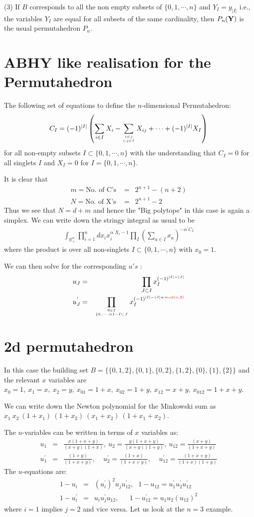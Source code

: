 \documentclass[hidelinks,12pt]{article}
\newcommand{\bea}[1]{\begin{eqnarray}\label{#1} }
\newcommand{\eea}{\end{eqnarray}}
\def\bea{\begin{eqnarray}}
\def\eea{\end{eqnarray}}
\begin{document}
\begin{enumerate}
(3) If $B$ corresponds to all the non empty subsets of $\{0,1,\cdots,n \}$ and $Y_I =y_{|I|}$ i.e., the variables $Y_I$ are equal for all subsets of the same cardinality, then $P_n({\bf Y})$ is the usual permutahedron $P_n$. 

\section*{ABHY like realisation for the Permutahedron}
The following set of equations to define the $n$-dimensional Permutahedron: 
\bea
C_I = (-1)^{|I|} \left( \sum_{i \in I} X_i - \sum _{{i<j}\atop{i,j \in I}} X_{ij} +\cdots + (-1)^{|I|}  X_I \right) \nonumber
\eea
for all non-empty subsets $I \subset \{0,1,\cdots,n\}$ with the understanding that $C_{I} =0$ for all singlets $I$ and $X_{I} =0$ for $I=\{ 0,1,\cdots,n \}$. 

It is clear that
\bea
m= \text{No. of  C's }&=& 2^{n+1}-(n+2) \nonumber \\
N= \text{No. of X's} &=& 2^{n+1}- 2 \nonumber 
\eea
Thus we see that $N= d+m$ and hence the "Big polytope" in this case is again a simplex. We can write down the stringy integral as usual to be 
\bea
\int_{\mathbb{R}^{n}_{+}} \prod_{i =1}^{n} d x_i x_i^{\alpha^{'} X_i -1} \prod_{I} \left (\sum_{a\in I} x_a \right) ^{-\alpha^{'} C_I} \nonumber
\eea 
where the product is over all non-singlets $ I \subset \{0,1,\cdots,n\}$ with $x_{0} =1$.

We can then solve for the corresponding $u's$ :
\bea
u_J &=& ~~\prod_{J \subset I} x_I^{(-1)^{|I|-|J|}} \nonumber \\
u^{'}_J &=& \prod_{{0 \in I}\atop{ \{0,\cdots,n\} - I \subset J}} x_I^{(-1)^{|I|-|J|+\color{red}{mod(n, 2)}}} \nonumber
\eea

\section*{2d permutahedron}
In this case the building set $B=\{ \{ 0,1,2\},\{ 0,1\},\{0,2\},\{1,2\},\{0\},\{1\},\{2\}\}$ and the relevant $x$ variables are $x_0=1, ~x_1=x, ~x_2=y, ~x_{01}=1+x, ~x_{02}=1+y,~ x_{12}=x+y,~ x_{012}=1+x+y$. 

We can write down the Newton polynomial for the Minkowski sum as $ x_1~ x_2~(1+x_1)~(1+x_2)~(x_1+x_2)~(1+x_1+x_2)$.

The $u$-variables can be written in terms of $x$ variables as:
\bea
u_1&=&\frac{x(1+x+y)}{(x+y)(1+x)}, ~ u_2 =\frac{y(1+x+y)}{(x+y)(1+y)},~ u_{12}=\frac{(x+y)}{(1+x+y)}\nonumber \\
u^{'}_1&=&\frac{(1+y)}{(1+x+y)}, ~~~~~ u^{'}_2=\frac{(1+x)}{(1+x+y)},~~~~~ u^{'}_{12}= \frac{(1+x+y)}{(1+x)(1+y)} \nonumber
\eea
The $u$-equations are:
\bea
1-u_i &=& (u^{'}_i)^2 u_j u^{'}_{12}, ~~~ 1-u_{12} = u^{'}_{1} u^{'}_{2} u^{'}_{12} \nonumber \\
1-u^{'}_i &=& u_i u^{'}_j u_{12}, ~~~~~~~ 1-u^{'}_{12} = u_{1} u_{2} (u_{12})^2 \nonumber
\eea
where $i=1$ implies $j=2$ and vice versa.
Let us look at the $n=3$ example.


\end{enumerate}
\end{document}
